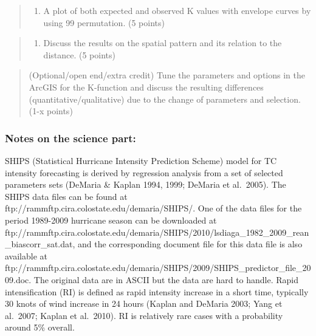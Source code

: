 \documentclass[11pt]{article}
\providecommand{\tightlist}{%
      \setlength{\itemsep}{0pt}\setlength{\parskip}{0pt}}
\begin{document}
    \begin{quote}
\begin{enumerate}
\def\labelenumi{(\arabic{enumi})}
\setcounter{enumi}{1}
\tightlist
\item
  A plot of both expected and observed K values with envelope curves by
  using 99 permutation. (5 points)
\end{enumerate}
\end{quote}

\vskip 0.2in


    \begin{quote}
\begin{enumerate}
\def\labelenumi{(\arabic{enumi})}
\setcounter{enumi}{2}
\tightlist
\item
  Discuss the results on the spatial pattern and its relation to the
  distance. (5 points)
\end{enumerate}
\end{quote}

\vskip 0.2in


    \begin{quote}
(Optional/open end/extra credit) Tune the parameters and options in the
ArcGIS for the K-function and discuss the resulting differences
(quantitative/qualitative) due to the change of parameters and
selection. (1-x points)
\end{quote}

\vskip 0.2in


    \hypertarget{notes-on-the-science-part}{%
\subsubsection{Notes on the science
part:}\label{notes-on-the-science-part}}

SHIPS (Statistical Hurricane Intensity Prediction Scheme) model for TC
intensity forecasting is derived by regression analysis from a set of
selected parameters sets (DeMaria \& Kaplan 1994, 1999; DeMaria et
al.~2005). The SHIPS data files can be found at
ftp://rammftp.cira.colostate.edu/demaria/SHIPS/. One of the data files
for the period 1989-2009 hurricane season can be downloaded at
ftp://rammftp.cira.colostate.edu/demaria/SHIPS/2010/lsdiaga\_1982\_2009\_rean\_biascorr\_sat.dat,
and the corresponding document file for this data file is also available
at
ftp://rammftp.cira.colostate.edu/demaria/SHIPS/2009/SHIPS\_predictor\_file\_2009.doc.
The original data are in ASCII but the data are hard to handle. Rapid
intensification (RI) is defined as rapid intensity increase in a short
time, typically 30 knots of wind increase in 24 hours (Kaplan and
DeMaria 2003; Yang et al.~2007; Kaplan et al.~2010). RI is relatively
rare cases with a probability around 5\% overall.
\end{document}
